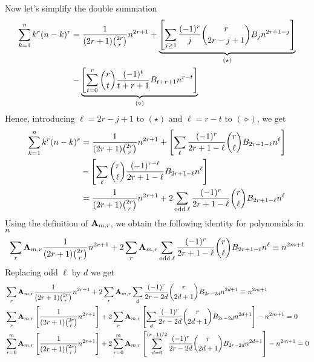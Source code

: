 Now let's simplify the double summation
\begin{equation}
    \begin{split}
        \sum_{k=1}^{n} k^{r} (n-k)^{r}
        &= \frac{1}{(2r+1) \binom{2r}r} n^{2r+1}
        + \underbrace{\left[ \sum_{j \geq 1} \frac{(-1)^r}{j} \binom{r}{2r-j+1} {B}\sb{j} n^{2r+1-j} \right]}_{(\star)} \\
        &- \underbrace{\left[ \sum_{t=0}^{r} \binom{r}{t} \frac{(-1)^t}{t+r+1} {B}\sb{t+r+1} n^{r-t} \right]}_{(\diamond)}
    \end{split}\label{eq:equation6}
\end{equation}
Hence, introducing $\ell=2r-j+1$ to $(\star)$ and $\ell=r-t$ to $(\diamond)$, we get
\begin{equation}
    \begin{split}
        \sum_{k=1}^{n} k^{r} (n-k)^{r}
        &= \frac{1}{(2r+1) \binom{2r}r} n^{2r+1}
        + \left[ \sum_{\ell} \frac{(-1)^r}{2r+1-\ell} \binom{r}{\ell} {B}\sb{2r+1-\ell} n^{\ell} \right] \\
        &- \left[ \sum_{\ell} \binom{r}{\ell} \frac{(-1)^{r-\ell}}{2r+1-\ell} {B}\sb{2r+1-\ell} n^{\ell} \right]\\
        &= \frac{1}{(2r+1) \binom{2r}r} n^{2r+1} + 2 \sum_{\mathrm{odd \; \ell}} \frac{(-1)^r}{2r+1-\ell} \binom{r}{\ell} {B}\sb{2r+1-\ell} n^{\ell}
    \end{split}\label{eq:polynomial-sum-1}
\end{equation}
Using the definition of ${\mathbf{A}} \sb{m,r}$, we obtain the following identity for polynomials in $n$
\begin{equation}
    \label{eq:equation}
    \sum_{r} {\mathbf{A}} \sb{m,r} \frac{1}{(2r+1) \binom{2r}r} n^{2r+1}
    + 2 \sum_{r} {\mathbf{A}} \sb{m,r} \sum_{\mathrm{odd \; \ell}} \frac{(-1)^r}{2r+1-\ell} \binom{r}{\ell} {B}\sb{2r+1-\ell} n^{\ell}
    \equiv n^{2m+1}
\end{equation}
Replacing odd $\ell$ by $d$ we get
\begin{equation}
    \begin{split}
        &\sum_{r} {\mathbf{A}} \sb{m,r} \frac{1}{(2r+1) \binom{2r}r} n^{2r+1}
        + 2 \sum_{r} {\mathbf{A}} \sb{m,r} \sum_{d} \frac{(-1)^r}{2r-2d} \binom{r}{2d+1} {B}\sb{2r-2d} n^{2d+1}
        \equiv n^{2m+1} \\
        &\sum_{r} {\mathbf{A}} \sb{m,r} \left[ \frac{1}{(2r+1) \binom{2r}r} n^{2r+1} \right]
        + 2 \sum_{r} {\mathbf{A}} \sb{m,r} \left[ \sum_{d} \frac{(-1)^r}{2r-2d} \binom{r}{2d+1} {B}\sb{2r-2d} n^{2d+1} \right]
        - n^{2m+1} = 0 \\
        &\sum_{r=0}^{m} {\mathbf{A}} \sb{m,r} \left[ \frac{1}{(2r+1) \binom{2r}r} n^{2r+1} \right]
        + 2 \sum_{r=0}^{m} {\mathbf{A}} \sb{m,r} \left[ \sum_{d=0}^{(r-1)/2} \frac{(-1)^r}{2r-2d} \binom{r}{2d+1} {B}\sb{2r-2d} n^{2d+1} \right]
        - n^{2m+1} = 0 \\
    \end{split}\label{eq:equation7}
\end{equation}
